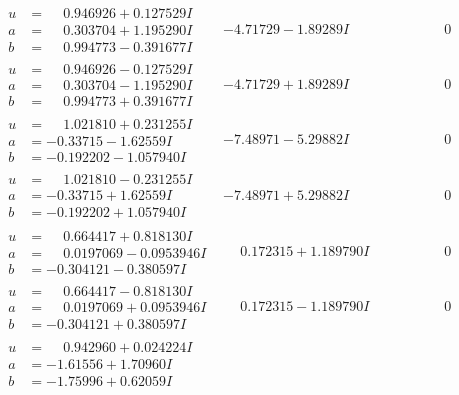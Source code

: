 \documentclass[1p]{elsarticle_modified}
\theoremstyle{definition}
\begin{document}
$$\begin{array}{c|c|c}
\begin{aligned}
u &= \phantom{-}0.946926 + 0.127529 I \\
a &= \phantom{-}0.303704 + 1.195290 I \\
b &= \phantom{-}0.994773 - 0.391677 I\end{aligned}
 & -4.71729 - 1.89289 I & \phantom{-0.000000 } 0 \\ \hline\begin{aligned}
u &= \phantom{-}0.946926 - 0.127529 I \\
a &= \phantom{-}0.303704 - 1.195290 I \\
b &= \phantom{-}0.994773 + 0.391677 I\end{aligned}
 & -4.71729 + 1.89289 I & \phantom{-0.000000 } 0 \\ \hline\begin{aligned}
u &= \phantom{-}1.021810 + 0.231255 I \\
a &= -0.33715 - 1.62559 I \\
b &= -0.192202 - 1.057940 I\end{aligned}
 & -7.48971 - 5.29882 I & \phantom{-0.000000 } 0 \\ \hline\begin{aligned}
u &= \phantom{-}1.021810 - 0.231255 I \\
a &= -0.33715 + 1.62559 I \\
b &= -0.192202 + 1.057940 I\end{aligned}
 & -7.48971 + 5.29882 I & \phantom{-0.000000 } 0 \\ \hline\begin{aligned}
u &= \phantom{-}0.664417 + 0.818130 I \\
a &= \phantom{-}0.0197069 - 0.0953946 I \\
b &= -0.304121 - 0.380597 I\end{aligned}
 & \phantom{-}0.172315 + 1.189790 I & \phantom{-0.000000 } 0 \\ \hline\begin{aligned}
u &= \phantom{-}0.664417 - 0.818130 I \\
a &= \phantom{-}0.0197069 + 0.0953946 I \\
b &= -0.304121 + 0.380597 I\end{aligned}
 & \phantom{-}0.172315 - 1.189790 I & \phantom{-0.000000 } 0 \\ \hline\begin{aligned}
u &= \phantom{-}0.942960 + 0.024224 I \\
a &= -1.61556 + 1.70960 I \\
b &= -1.75996 + 0.62059 I\end{aligned}

\end{array}$$
\end{document}
